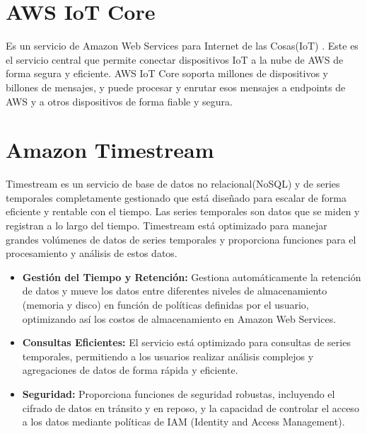 \section{AWS IoT Core}
Es un servicio de Amazon Web Services para Internet de las Cosas(IoT) \cite{gutierrez2011aplicacion}.
Este es el servicio central que permite conectar dispositivos IoT a la nube de AWS de forma segura y eficiente. AWS IoT Core soporta millones de dispositivos y billones de mensajes, y puede procesar y enrutar esos mensajes a endpoints de AWS y a otros dispositivos de forma fiable y segura.

\section{Amazon Timestream}
Timestream \cite{gutierrez2011aplicacion} es un servicio de base de datos no relacional(NoSQL) y de series temporales completamente gestionado que está diseñado para escalar de forma eficiente y rentable con el tiempo. Las series temporales son datos que se miden y registran a lo largo del tiempo. Timestream está optimizado para manejar grandes volúmenes de datos de series temporales y proporciona funciones para el procesamiento y análisis de estos datos.
\begin{itemize}
    \item \textbf{Gestión del Tiempo y Retención:} Gestiona automáticamente la retención de datos y mueve los datos entre diferentes niveles de almacenamiento (memoria y disco) en función de políticas definidas por el usuario, optimizando así los costos de almacenamiento en Amazon Web Services.
    \item \textbf{Consultas Eficientes:} El servicio está optimizado para consultas de series temporales, permitiendo a los usuarios realizar análisis complejos y agregaciones de datos de forma rápida y eficiente.
    \item \textbf{Seguridad:} Proporciona funciones de seguridad robustas, incluyendo el cifrado de datos en tránsito y en reposo, y la capacidad de controlar el acceso a los datos mediante políticas de IAM (Identity and Access Management).
 
\end{itemize}

